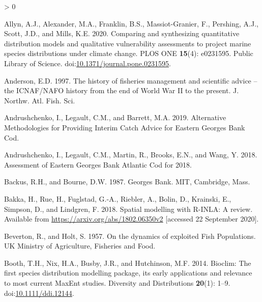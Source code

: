 \documentclass[
]{article}
\newlength{\cslhangindent}
\newenvironment{CSLReferences}[2] %
 {%
  \setlength{\parindent}{0pt}
  \ifodd #1 \everypar{\setlength{\hangindent}{\cslhangindent}}\ignorespaces\fi
  \ifnum #2 > 0
  \setlength{\parskip}{#2\baselineskip}
  \fi
 }%
 {}
\begin{document}
\hypertarget{refs}{}
\begin{CSLReferences}{1}{0}
\leavevmode\hypertarget{ref-allynComparingSynthesizingQuantitative2020}{}%
Allyn, A.J., Alexander, M.A., Franklin, B.S., Massiot-Granier, F., Pershing, A.J., Scott, J.D., and Mills, K.E. 2020. Comparing and synthesizing quantitative distribution models and qualitative vulnerability assessments to project marine species distributions under climate change. PLOS ONE \textbf{15}(4): e0231595. {Public Library of Science}. doi:\href{https://doi.org/10.1371/journal.pone.0231595}{10.1371/journal.pone.0231595}.

\leavevmode\hypertarget{ref-andersonHistoryFisheriesManagement1997}{}%
Anderson, E.D. 1997. The history of fisheries management and scientific advice -- the {ICNAF}/{NAFO} history from the end of {World War II} to the present. J. Northw. Atl. Fish. Sci.

\leavevmode\hypertarget{ref-andrushchenkoAlternativeMethodologiesProviding2019}{}%
Andrushchenko, I., Legault, C.M., and Barrett, M.A. 2019. Alternative {Methodologies} for {Providing Interim Catch Advice} for {Eastern Georges Bank Cod}.

\leavevmode\hypertarget{ref-andrushchenkoAssessmentEasternGeorges2018}{}%
Andrushchenko, I., Legault, C.M., Martin, R., Brooks, E.N., and Wang, Y. 2018. Assessment of {Eastern Georges Bank Atlantic Cod} for 2018.

\leavevmode\hypertarget{ref-backusGeorgesBank1987}{}%
Backus, R.H., and Bourne, D.W. 1987. Georges {Bank}. {MIT}, {Cambridge, Mass}.

\leavevmode\hypertarget{ref-bakkaSpatialModellingRINLA2018}{}%
Bakka, H., Rue, H., Fuglstad, G.-A., Riebler, A., Bolin, D., Krainski, E., Simpson, D., and Lindgren, F. 2018. Spatial modelling with {R}-{INLA}: {A} review. Available from \url{https://arxiv.org/abs/1802.06350v2} {[}accessed 22 September 2020{]}.

\leavevmode\hypertarget{ref-bevertonDynamicsExploitedFish1957}{}%
Beverton, R., and Holt, S. 1957. On the dynamics of exploited {Fish Populations}. {UK Ministry of Agriculture, Fisheries and Food}.

\leavevmode\hypertarget{ref-boothBioclimFirstSpecies2014}{}%
Booth, T.H., Nix, H.A., Busby, J.R., and Hutchinson, M.F. 2014. Bioclim: The first species distribution modelling package, its early applications and relevance to most current {MaxEnt} studies. Diversity and Distributions \textbf{20}(1): 1--9. doi:\href{https://doi.org/10.1111/ddi.12144}{10.1111/ddi.12144}.


\end{CSLReferences}
\end{document}
